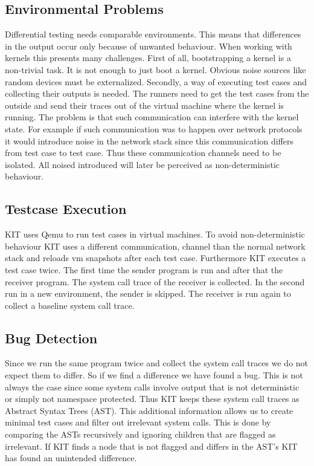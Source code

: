 \documentclass[10pt,twocolumn,a4paper]{article}
\begin{document}
\subsection{Environmental Problems}
Differential testing needs comparable environments. This means that differences in the output
occur only because of unwanted behaviour. When working with kernels this presents many challenges.
First of all, bootstrapping a kernel is a non-trivial task. It is not enough to just boot a kernel. 
Obvious noise sources like random devices must be externalized.
Secondly, a way of executing test cases and collecting their outputs is needed. 
The runners need to get the test cases from the outside and send their traces out of the virtual machine
where the kernel is running.
The problem is that such communication can interfere with the kernel state. For example if such
communication was to happen over network protocols it would introduce noise in the network stack
since this communication differs from test case to test case. 
Thus these communication channels need to be isolated. All noised introduced will later be perceived as
non-deterministic behaviour.

\subsection{Testcase Execution}
KIT uses Qemu to run test cases in virtual machines.
To avoid non-deterministic behaviour KIT uses a different communication, channel than the normal network stack and reloads vm snapshots after
each test case. Furthermore KIT  executes a test case twice.
The first time the sender program is run and after that the receiver program. 
The system call trace of the receiver is collected.
In the second run in a new environment, the sender is skipped. 
The receiver is run again to collect a baseline system call trace\cite{0}. 
\subsection{Bug Detection}
Since we run the same program twice and collect the system call traces we do not expect them to
differ. So if we find a difference we have found a bug. This is not always the case since some
system calls involve output that is not deterministic or simply not namespace protected.
Thus KIT keeps these system call traces as Abstract Syntax Trees (AST). This additional information allows 
us to create minimal test cases and filter out irrelevant system calls. 
This is done by comparing the ASTs recursively and ignoring children that are flagged as irrelevant. 
If KIT finds a node that is not flagged and differs in the AST's KIT has found an unintended difference. 
\end{document}
